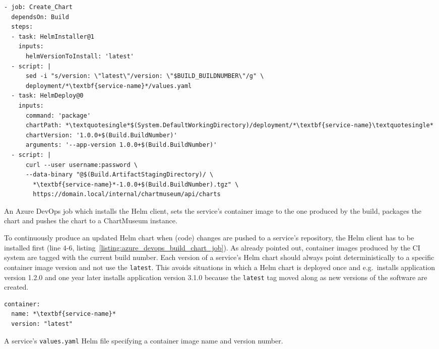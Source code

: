\begin{listing}[H]
  \begin{verbatim}
- job: Create_Chart
  dependsOn: Build
  steps:
  - task: HelmInstaller@1
    inputs:
      helmVersionToInstall: 'latest'
  - script: |
      sed -i "s/version: \"latest\"/version: \"$BUILD_BUILDNUMBER\"/g" \
      deployment/*\textbf{service-name}*/values.yaml
  - task: HelmDeploy@0
    inputs:
      command: 'package'
      chartPath: *\textquotesingle*$(System.DefaultWorkingDirectory)/deployment/*\textbf{service-name}\textquotesingle*
      chartVersion: '1.0.0+$(Build.BuildNumber)'
      arguments: '--app-version 1.0.0+$(Build.BuildNumber)'
  - script: |
      curl --user username:password \
      --data-binary "@$(Build.ArtifactStagingDirectory)/ \
        *\textbf{service-name}*-1.0.0+$(Build.BuildNumber).tgz" \
        https://domain.local/internal/chartmuseum/api/charts
  \end{verbatim}
  \caption{An Azure DevOps job which installs the Helm client, sets the
  service's container image to the one produced by the build, packages the
  chart and pushes the chart to a ChartMuseum instance.}%
  \label{listing:azure_devops_build_chart_job}
\end{listing}

To continuously produce an updated Helm chart when (code) changes are pushed to
a service's repository, the Helm client has to be installed first (line 4-6,
listing~\ref{listing:azure_devops_build_chart_job}). As already pointed out,
container images produced by the \ac{CI} system are tagged with the current
build number. Each version of a service's Helm chart should always point
deterministically to a specific container image version and not use the
\texttt{latest}. This avoids situations in which a Helm chart is deployed once
and e.g.\ installs application version 1.2.0 and one year later installs
application version 3.1.0 because the \texttt{latest} tag moved along as new
versions of the software are created.

\begin{listing}[H]
  \begin{verbatim}
container:
  name: *\textbf{service-name}*
  version: "latest"
  \end{verbatim}
  \caption{A service's \texttt{values.yaml} Helm file specifying a container
  image name and version number.}%
  \label{listing:helm_values_ci_image_version}
\end{listing}

